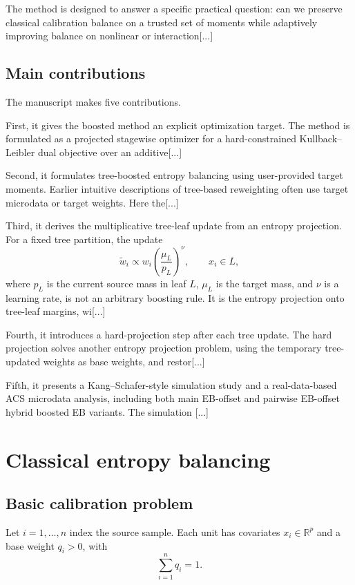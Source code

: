 \documentclass[11pt]{article}
\begin{document}
The method is designed to answer a specific practical question: can we preserve classical calibration balance on a trusted set of moments while adaptively improving balance on nonlinear or interaction[...]


\subsection{Main contributions}

The manuscript makes five contributions.

First, it gives the boosted method an explicit optimization target. The method is formulated as a projected stagewise optimizer for a hard-constrained Kullback--Leibler dual objective over an additive[...] 

Second, it formulates tree-boosted entropy balancing using user-provided target moments. Earlier intuitive descriptions of tree-based reweighting often use target microdata or target weights. Here the[...] 

Third, it derives the multiplicative tree-leaf update from an entropy projection. For a fixed tree partition, the update
\begin{equation*}
\widetilde w_i \propto w_i \left(\frac{\mu_L}{p_L}\right)^\nu, \qquad x_i\in L,
\end{equation*}
where $p_L$ is the current source mass in leaf $L$, $\mu_L$ is the target mass, and $\nu$ is a learning rate, is not an arbitrary boosting rule. It is the entropy projection onto tree-leaf margins, wi[...] 

Fourth, it introduces a hard-projection step after each tree update. The hard projection solves another entropy projection problem, using the temporary tree-updated weights as base weights, and restor[...] 

Fifth, it presents a Kang--Schafer-style simulation study and a real-data-based ACS microdata analysis, including both main EB-offset and pairwise EB-offset hybrid boosted EB variants. The simulation [...]

\section{Classical entropy balancing}

\subsection{Basic calibration problem}

Let $i=1,\ldots,n$ index the source sample. Each unit has covariates $x_i\in\mathbb{R}^p$ and a base weight $q_i>0$, with
\begin{equation*}
\sum_{i=1}^n q_i=1.
\end{equation*}
\end{document}
